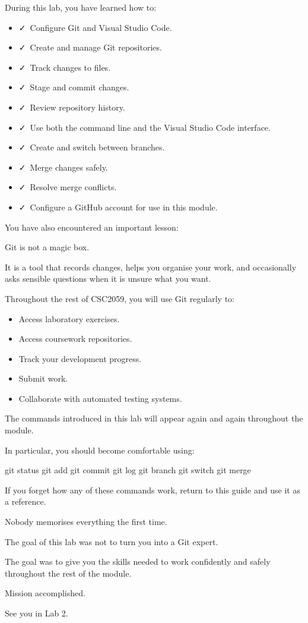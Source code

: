 \documentclass{csc2059practical}
\begin{document}
During this lab, you have learned how to:

\begin{itemize}
  \item \faCheck\ Configure Git and Visual Studio Code.
  \item \faCheck\ Create and manage Git repositories.
  \item \faCheck\ Track changes to files.
  \item \faCheck\ Stage and commit changes.
  \item \faCheck\ Review repository history.
  \item \faCheck\ Use both the command line and the Visual Studio Code interface.
  \item \faCheck\ Create and switch between branches.
  \item \faCheck\ Merge changes safely.
  \item \faCheck\ Resolve merge conflicts.
  \item \faCheck\ Configure a GitHub account for use in this module.
\end{itemize}
You have also encountered an important lesson:

Git is not a magic box.

It is a tool that records changes, helps you organise your work, and occasionally asks sensible questions when it is unsure what you want.

Throughout the rest of CSC2059, you will use Git regularly to:

\begin{itemize}
  \item Access laboratory exercises.
  \item Access coursework repositories.
  \item Track your development progress.
  \item Submit work.
  \item Collaborate with automated testing systems.
\end{itemize}
The commands introduced in this lab will appear again and again throughout the module.

In particular, you should become comfortable using:

\begin{terminalplain}
git status
git add
git commit
git log
git branch
git switch
git merge
\end{terminalplain}
If you forget how any of these commands work, return to this guide and use it as a reference.

Nobody memorises everything the first time.

The goal of this lab was not to turn you into a Git expert.

The goal was to give you the skills needed to work confidently and safely throughout the rest of the module.

Mission accomplished.

See you in Lab 2.
\end{document}
